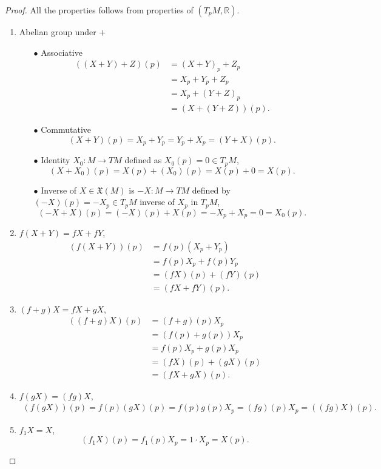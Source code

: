\documentclass[a4paper]{article}
\theoremstyle{remark}
\newcommand{\er}{\mathbb{R}} %
\begin{document}
\begin{proof}
All the properties follows from properties of $(T_pM,\er)$.
\begin{enumerate}[nolistsep]
\item Abelian group under $+$
\begin{enumerate}[nolistsep]
\item[$\bullet$ ] Associative
\begin{align*}
((X+Y)+Z)(p) &= (X+Y)_p + Z_p \\ &= X_p+Y_p+Z_p \\ &= X_p + (Y+Z)_p \\ &= (X+(Y+Z))(p).
\end{align*}
\item[$\bullet$ ] Commutative
$$
(X+Y)(p) = X_p + Y_p  = Y_p + X_p = (Y+X)(p).
$$ 
\item[$\bullet$] Identity $X_0 : M \to TM$ defined as $X_0(p) = 0 \in T_pM$,
$$
(X+X_0)(p) = X(p) + (X_0)(p) = X(p) + 0 = X(p).
$$
\item[$\bullet$ ] Inverse of $X \in \mathfrak{X}(M)$ is $-X : M \to TM$ defined by $(-X)(p) = -X_p \in T_pM$ inverse of $X_p$ in $T_pM$,
$$
(-X + X)(p) = (-X)(p) + X(p) = -X_p + X_p = 0 = X_0(p).
$$
\end{enumerate}
\item $f(X+Y) = fX + fY$,
\begin{align*}
(f(X+Y))(p) &= f(p) (X_p + Y_p)\\ &= f(p)X_p + f(p)Y_p \\ &= (fX)(p) + (fY)(p) \\ &= (fX + fY)(p).
\end{align*}
\item $(f+g)X = fX + gX$,
\begin{align*}
((f+g)X)(p) &= (f+g)(p) X_p \\ &= (f(p)+g(p))X_p \\ &= f(p)X_p + g(p)X_p \\  &= (fX)(p) + (gX)(p) \\ &= (fX + gX)(p). 
\end{align*}
\item $f(gX) = (fg)X$,
\begin{align*}
(f(gX))(p) = f(p) (gX)(p) = f(p)g(p) X_p = (fg)(p)X_p = ((fg)X)(p).
\end{align*}
\item $f_1 X = X$,
$$
(f_1X)(p) = f_1(p) X_p = 1\cdot X_p = X(p). 
$$
\end{enumerate}
\end{proof}
\end{document}
